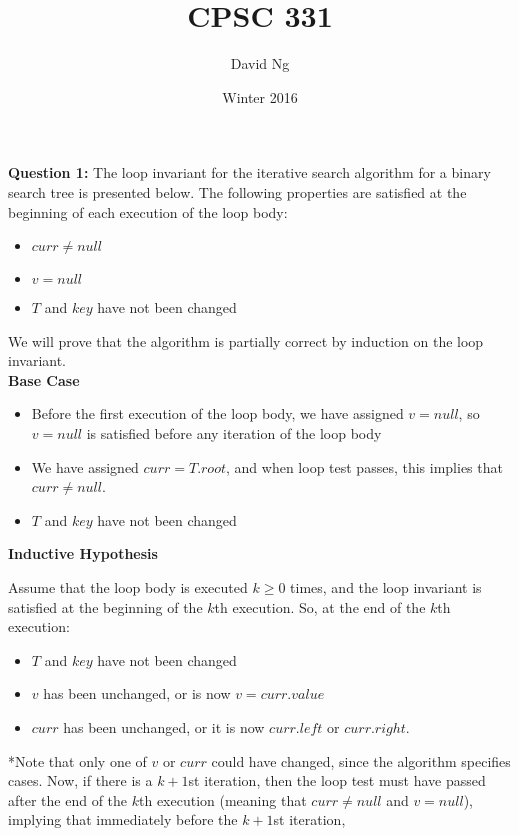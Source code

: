 \documentclass[11pt]{article}
\theoremstyle{plain} %
\theoremstyle{definition}
\theoremstyle{example}
\theoremstyle{remark}
\begin{document}
\title{CPSC 331}
\author{David Ng}
\date{Winter 2016}
\maketitle

\eject

\textbf{Question 1:}
The loop invariant for the iterative search algorithm for a binary search tree is presented below. The following properties are satisfied at the beginning of each execution of the loop body:

\begin{itemize}
\item $curr \neq null$
\item $v = null$
\item $T$ and $key$ have not been changed
\end{itemize}

We will prove that the algorithm is partially correct by induction on the loop invariant.
\\

\textbf{Base Case}
\begin{itemize}
\item Before the first execution of the loop body, we have assigned $v=null$, so $v=null$ is satisfied before any iteration of the loop body
\item We have assigned $curr = T.root$, and when loop test passes, this implies that $curr \neq null$.
\item $T$ and $key$ have not been changed
\end{itemize}

\textbf{Inductive Hypothesis}


Assume that the loop body is executed $k\geq 0$ times, and the loop invariant is satisfied at the beginning of the $k$th execution. So, at the end of the $k$th execution: 
\begin{itemize}
\item $T$ and $key$ have not been changed
\item $v$ has been unchanged, or is now $v=curr.value$
\item $curr$ has been unchanged, or it is now $curr.left$ or $curr.right$.
\end{itemize}
*Note that only one of $v$ or $curr$ could have changed, since the algorithm specifies cases. Now, if there is a $k+1$st iteration, then the loop test must have passed after the end of the $k$th execution (meaning that $curr \neq null$ and $v = null$), implying that immediately before the $k+1$st iteration, 
\end{document}
